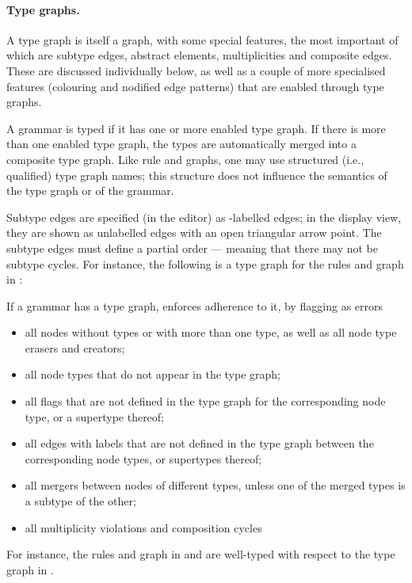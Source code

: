 \paragraph{Type graphs.}

A type graph is itself a graph, with some special features, the most important
of which are subtype edges, abstract elements, multiplicities and composite
edges. These are discussed individually below, as well as a couple of more
specialised features (colouring and nodified edge patterns) that are enabled
through type graphs.

A grammar is typed if it has one or more enabled type graph. If there is more
than one enabled type graph, the types are automatically merged into a
composite type graph. Like rule and graphs, one may use structured (i.e.,
qualified) type graph names; this structure does not influence the semantics of
the type graph or of the grammar.

Subtype edges are specified (in the editor) as \subP-labelled edges; in
the display view, they are shown as unlabelled edges with an open triangular
arrow point. The subtype edges must define a partial order --- meaning that
there may not be subtype cycles. For instance, the following is a type graph
for the rules and graph in :

%
If a grammar has a type graph, \GROOVE enforces adherence to it, by flagging as
errors

\begin{itemize}\noitemsep
\item all nodes without types or with more than one type, as well as all
  node type erasers and creators;
\item all node types that do not appear in the type graph;
\item all flags that are not defined in the type graph for the corresponding
  node type, or a supertype thereof;
\item all edges with labels that are not defined in the type graph between the
  corresponding node types, or supertypes thereof;
\item all mergers between nodes of different types, unless one of the merged
  types is a subtype of the other;
\item all multiplicity violations and composition cycles 
\end{itemize}
%
For instance, the rules and graph in  and 
are well-typed with respect to the type graph in .

